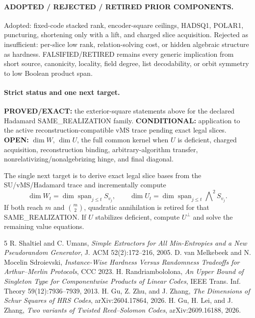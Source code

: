 \documentclass[11pt]{article}
\begin{document}
\paragraph{ADOPTED / REJECTED / RETIRED PRIOR COMPONENTS.}
Adopted: fixed-code stacked rank, encoder-square ceilings, HADSQ1, POLAR1, puncturing, shortening only with a lift, and charged slice acquisition. Rejected as insufficient: per-slice low rank, relation-solving cost, or hidden algebraic structure as hardness. FALSIFIED/RETIRED remains every generic implication from short source, canonicity, locality, field degree, list decodability, or orbit symmetry to low Boolean product span.

\paragraph{Strict status and one next target.}
\textbf{PROVED/EXACT:} the exterior-square statements above for the declared Hadamard SAME\_REALIZATION family. \textbf{CONDITIONAL:} application to the active reconstruction-compatible vMS trace pending exact legal slices. \textbf{OPEN:} \(\dim W\), \(\dim U\), the full common kernel when \(U\) is deficient, charged acquisition, reconstruction binding, arbitrary-algorithm transfer, nonrelativizing/nonalgebrizing hinge, and final diagonal.

The single next target is to derive exact legal slice bases from the SU/vMS/Hadamard trace and incrementally compute
\[
\dim W_t=\dim\operatorname{span}_{j\le t}S_{v_j},\qquad
\dim U_t=\dim\operatorname{span}_{j\le t}\bigwedge\nolimits^2S_{v_j}.
\]
If both reach \(m\) and \(\binom m2\), quadratic annihilation is retired for that SAME\_REALIZATION. If \(U\) stabilizes deficient, compute \(U^\perp\) and solve the remaining value equations.

\begin{thebibliography}{5}
 R. Shaltiel and C. Umans, \emph{Simple Extractors for All Min-Entropies and a New Pseudorandom Generator}, J. ACM 52(2):172--216, 2005.
 D. van Melkebeek and N. Mocelin Sdroievski, \emph{Instance-Wise Hardness Versus Randomness Tradeoffs for Arthur--Merlin Protocols}, CCC 2023.
 H. Randriambololona, \emph{An Upper Bound of Singleton Type for Componentwise Products of Linear Codes}, IEEE Trans. Inf. Theory 59(12):7936--7939, 2013.
 H. Gu, Z. Zhu, and J. Zhang, \emph{The Dimensions of Schur Squares of HRS Codes}, arXiv:2604.17864, 2026.
 H. Gu, H. Lei, and J. Zhang, \emph{Two variants of Twisted Reed--Solomon Codes}, arXiv:2609.16188, 2026.
\end{thebibliography}
\end{document}
